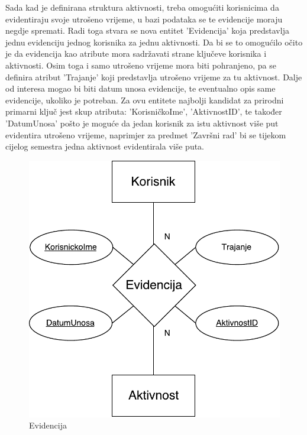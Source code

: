 \documentclass[times, utf8, zavrsni]{fer}
\begin{document}
Sada kad je definirana struktura aktivnosti, treba omogućiti korisnicima da evidentiraju svoje utrošeno vrijeme, u bazi podataka se te evidencije moraju negdje spremati. Radi toga stvara se nova entitet 'Evidencija' koja predstavlja jednu evidenciju jednog korisnika za jednu aktivnosti. Da bi se to omogućilo očito je da evidencija kao atribute mora sadržavati strane ključeve korisnika i aktivnosti. Osim toga i samo utrošeno vrijeme mora biti pohranjeno, pa se definira atribut 'Trajanje' koji predstavlja utrošeno vrijeme za tu aktivnost. Dalje od interesa mogao bi biti datum unosa evidencije, te eventualno opis same evidencije, ukoliko je potreban. Za ovu entitete najbolji kandidat za prirodni primarni ključ jest skup atributa: 'KorisničkoIme', 'AktivnostID', te također 'DatumUnosa' pošto je moguće da jedan korisnik za istu aktivnost više put evidentira utrošeno vrijeme, naprimjer za predmet 'Završni rad' bi se tijekom cijelog semestra jedna aktivnost evidentirala više puta.

\begin{figure}[H]
\centering
\includegraphics{img/evidencija.pdf}
\caption{Evidencija}
\label{fig:evidencija}
\end{figure}
\end{document}
